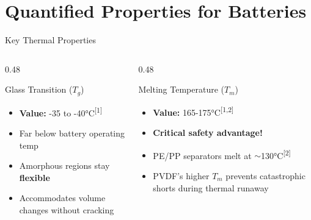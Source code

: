 \documentclass[aspectratio=169]{beamer}
\begin{document}
\section{Quantified Properties for Batteries}

\begin{frame}{Key Thermal Properties}
    \begin{columns}[T]
        \begin{column}{0.48\textwidth}
            \begin{block}{Glass Transition ($T_g$)}
                \begin{itemize}
                    \item \textbf{Value:} -35 to -40\si{\celsius}\textsuperscript{[1]}
                    \item Far below battery operating temp
                    \item Amorphous regions stay \textbf{flexible}
                    \item Accommodates volume changes without cracking
                \end{itemize}
            \end{block}
        \end{column}
        
        \begin{column}{0.48\textwidth}
            \begin{alertblock}{Melting Temperature ($T_m$)}
                \begin{itemize}
                    \item \textbf{Value:} 165-175\si{\celsius}\textsuperscript{[1,2]}
                    \item \textbf{Critical safety advantage!}
                    \item PE/PP separators melt at $\sim$130\si{\celsius}\textsuperscript{[2]}
                    \item PVDF's higher $T_m$ prevents catastrophic shorts during thermal runaway
                \end{itemize}
            \end{alertblock}
        \end{column}
    \end{columns}
    
    \vspace{0.3cm}
    \begin{center}
    \end{center}
\end{frame}
\end{document}
